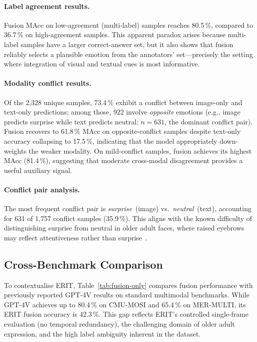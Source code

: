 \paragraph{Label agreement results.}
Fusion MAcc on low-agreement (multi-label) samples reaches 80.5\,\%,
compared to 36.7\,\% on high-agreement samples.  This apparent paradox
arises because multi-label samples have a larger correct-answer set,
but it also shows that fusion reliably selects a plausible emotion
from the annotators' set---precisely the setting where integration
of visual and textual cues is most informative.

\paragraph{Modality conflict results.}
Of the 2{,}328 unique samples, 73.4\,\% exhibit a conflict between
image-only and text-only predictions; among those, 922 involve
\emph{opposite} emotions (e.g., image predicts surprise while text
predicts neutral; $n=631$, the dominant conflict pair).
Fusion recovers to 61.8\,\% MAcc on opposite-conflict samples despite
text-only accuracy collapsing to 17.5\,\%, indicating that the model
appropriately down-weights the weaker modality.
On mild-conflict samples, fusion achieves its highest MAcc (81.4\,\%),
suggesting that moderate cross-modal disagreement provides a useful
auxiliary signal.

\paragraph{Conflict pair analysis.}
The most frequent conflict pair is \emph{surprise}~(image) vs.\
\emph{neutral}~(text), accounting for 631 of 1{,}757 conflict samples
(35.9\,\%).  This aligns with the known difficulty of distinguishing
surprise from neutral in older adult faces, where raised eyebrows may
reflect attentiveness rather than surprise~\cite{ma2019elderreact}.



\subsection{Cross-Benchmark Comparison}
\label{sec:cross-benchmark}

To contextualise ERIT, Table~\ref{tab:fusion-only} compares fusion
performance with previously reported GPT-4V results on standard
multimodal benchmarks.  While GPT-4V achieves up to 80.4\,\% on CMU-MOSI
and 65.4\,\% on MER-MULTI, its ERIT fusion accuracy is 42.3\,\%.  This gap
reflects ERIT's controlled single-frame evaluation (no temporal
redundancy), the challenging domain of older adult expression, and the
high label ambiguity inherent in the dataset.
